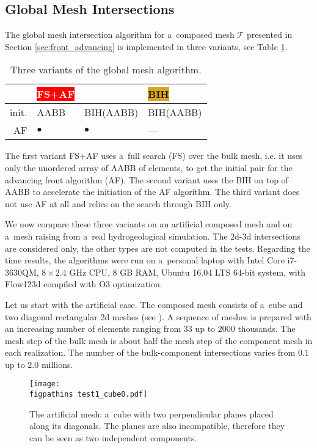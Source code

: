 \subsection{Global Mesh Intersections}
The global mesh intersection algorithm for a~composed mesh $\mathcal T$ presented in Section \ref{sec:front_advancing} is
implemented in three variants, see Table \ref{tab:search_algorithms}.
\begin{table}[!htb]
\begin{center}
\bgroup
\def\arraystretch{1.2}
\setlength\tabcolsep{5pt}
\begin{tabular}{r
                >{\centering\arraybackslash}p{20ex}
                >{\centering\arraybackslash}p{20ex}
                >{\centering\arraybackslash}p{20ex}}
    \toprule
    &   \colorbox{red}{\textcolor{white}{FS+AF\vphantom{By}}} &
        \colorbox{NavyBlue}{\textcolor{white}{BIH+AF\vphantom{By}}} & 
        \colorbox{Goldenrod}{BIH\vphantom{By}} \\ \midrule
    init. & AABB & BIH(AABB) & BIH(AABB) \\
    AF   & $\bullet$ & $\bullet$ & --- \\
    \bottomrule
\end{tabular}
\caption{Three variants of the global mesh algorithm.}
\label{tab:search_algorithms}
\egroup
\end{center}
\end{table}
The first variant FS+AF uses a~full search (FS) over the bulk mesh, i.e. it uses only the unordered array of AABB of elements,
to get the initial pair for the advancing front algorithm (AF).
The second variant uses the BIH on top of AABB to accelerate the initiation of the AF algorithm.
The third variant does not use AF at all and relies on the search through BIH only. 

We now compare these three variants on an artificial composed mesh and on a~mesh raising from a~real hydrogeological simulation.
The 2d-3d intersections are considered only, the other types are not computed in the tests.
Regarding the time results, the algorithms were run on a~personal laptop with Intel Core i7-3630QM, $8\times 2.4$ GHz CPU, 8 GB RAM,
Ubuntu 16.04 LTS 64-bit system, with Flow123d compiled with O3 optimization.

Let us start with the artificial case. The composed mesh consists of a~cube and two diagonal rectangular 2d meshes (see ).
A sequence of meshes is prepared with an increasing number of elements ranging
from $33$ up to $2000$ thousands. The mesh step of the bulk mesh is about half the mesh step of the component mesh in each realization. 
The number of the bulk-component intersections varies from $0.1$ up to $2.0$ millions.
%
\begin{figure}[!htb]
    \centering
    \texttt{[image: \\figpathins test1\_cube0.pdf]}
    \caption[Artificial mesh -- cube.]
    {The artificial mesh: a~cube with two perpendicular planes placed along its diagonals.
        The planes are also incompatible, therefore they can be seen as two independent components.}
    \label{fig:cube_mesh}
\end{figure}

